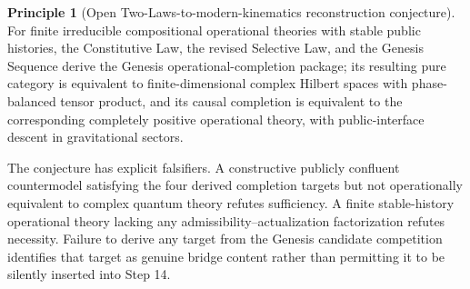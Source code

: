 \documentclass[11pt]{article}
\theoremstyle{plain}
\theoremstyle{definition}
\newtheorem{principle}[theorem]{Principle}
\theoremstyle{remark}
\begin{document}
\begin{principle}[Open Two-Laws-to-modern-kinematics reconstruction conjecture]
For finite irreducible compositional operational theories with stable public histories, the Constitutive Law, the revised Selective Law, and the Genesis Sequence derive the Genesis operational-completion package; its resulting pure category is equivalent to finite-dimensional complex Hilbert spaces with phase-balanced tensor product, and its causal completion is equivalent to the corresponding completely positive operational theory, with public-interface descent in gravitational sectors.
\end{principle}

The conjecture has explicit falsifiers. A constructive publicly confluent countermodel satisfying the four derived completion targets but not operationally equivalent to complex quantum theory refutes sufficiency. A finite stable-history operational theory lacking any admissibility--actualization factorization refutes necessity. Failure to derive any target from the Genesis candidate competition identifies that target as genuine bridge content rather than permitting it to be silently inserted into Step 14.
\end{document}
